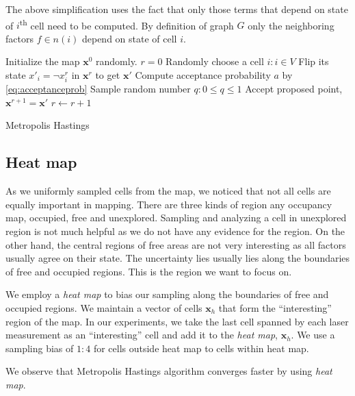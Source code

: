 \documentclass[letterpaper, 10 pt, conference]{ieeeconf} %
\newcommand{\vect}[1]{\mathbf{#1}}
\begin{document}
The above simplification uses the fact that only those terms  that depend on
state of $i$\textsuperscript{th} cell need to be computed. By definition
of graph $G$ only the neighboring factors $f \in n(i)$ depend on state of cell $i$.

% 
\begin{algorithm}
  Initialize the map $\vect{x}^0$ randomly.\;
  $r = 0$\;
   {
    Randomly choose a cell $i : i \in V$\;
    Flip its state $x'_i = \neg x^r_i$ in $\vect{x}^r$ to get $\vect{x}'$\;
    Compute acceptance probability $a$ by \eqref{eq:acceptanceprob}\;
    Sample random number $q : 0 \le q \le 1$\;
     {
      Accept proposed point, $\vect{x}^{r + 1} = \vect{x}'$\;
    } \Else {
      Reject proposed point, $\vect{x}^{r + 1} = \vect{x}^r$\;
    }
    $r \leftarrow r + 1$\;
  }
  \caption{Metropolis Hastings}
\end{algorithm}

\subsection{Heat map}
As we uniformly sampled cells from the map, we noticed that not all
cells are equally important in mapping. There are three kinds of region any
occupancy map, occupied, free and unexplored. Sampling and analyzing a cell in
unexplored region is not much helpful as we do not have any evidence for the
region. On the other hand, the central regions of free areas are not very
interesting as all factors usually agree on their state. The uncertainty lies
usually lies along the boundaries of free and occupied regions. This is the
region we want to focus on.

We employ a \emph{heat map} to bias our sampling along the boundaries of free and occupied regions. We maintain a vector of cells $\vect{x}_h$ that form the ``interesting'' region of the map. In our experiments, we take the last cell spanned by each laser measurement as an ``interesting'' cell and add it to the \emph{heat map}, $\vect{x}_h$. We use a sampling bias of $1:4$ for cells outside heat map to cells within heat map.

We observe that Metropolis Hastings algorithm converges faster by using \emph{heat map}.
\end{document}
